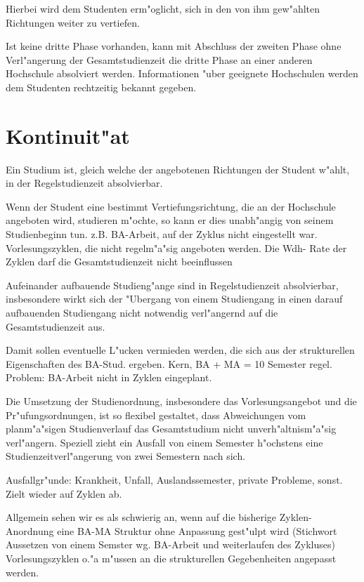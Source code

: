 Hierbei wird dem Studenten erm"oglicht, sich in den von ihm gew"ahlten Richtungen
weiter zu vertiefen.

Ist keine dritte Phase vorhanden, kann mit Abschluss der zweiten Phase ohne Verl"angerung der Gesamtstudienzeit die dritte Phase an einer anderen Hochschule absolviert werden. Informationen "uber geeignete Hochschulen werden dem Studenten rechtzeitig bekannt gegeben.


\section{Kontinuit"at}

Ein Studium ist, gleich welche der angebotenen Richtungen der Student w"ahlt, 
in der Regelstudienzeit absolvierbar.

\begin{kcmt}\begin{komacmt}
Wenn der Student eine bestimmt Vertiefungsrichtung, die an der Hochschule
angeboten wird, studieren m"ochte, so kann er dies unabh"angig von seinem Studienbeginn 
tun. z.B. BA-Arbeit, auf der Zyklus nicht eingestellt war. Vorlesungszyklen, die nicht 
regelm"a"sig angeboten werden. Die Wdh- Rate der Zyklen darf die Gesamtstudienzeit nicht beeinflussen
\end{komacmt}\end{kcmt}

Aufeinander aufbauende Studieng"ange sind in Regelstudienzeit absolvierbar,
insbesondere wirkt sich der "Ubergang von einem Studiengang in einen darauf aufbauenden Studiengang nicht notwendig verl"angernd 
auf die Gesamtstudienzeit aus.

\begin{kcmt}\begin{komacmt}
Damit sollen eventuelle L"ucken vermieden werden, die sich aus der strukturellen 
Eigenschaften des BA-Stud. ergeben. Kern, BA + MA = 10 Semester regel. Problem: 
BA-Arbeit nicht in Zyklen eingeplant.
\end{komacmt}\end{kcmt}

Die Umsetzung der Studienordnung, insbesondere das Vorlesungsangebot und die 
Pr"ufungsordnungen, ist so flexibel gestaltet, dass Abweichungen vom planm"a"sigen 
Studienverlauf das Gesamtstudium nicht unverh"altnism"a"sig verl"angern. 
Speziell zieht ein Ausfall von einem Semester h"ochstens eine Studienzeitverl"angerung 
von zwei Semestern nach sich.

\begin{kcmt}\begin{komacmt}
Ausfallgr"unde: Krankheit, Unfall, Auslandssemester, private Probleme, sonst. Zielt wieder auf Zyklen ab.


Allgemein sehen wir es als schwierig an, wenn auf die bisherige Zyklen-Anordnung eine 
BA-MA Struktur ohne Anpassung gest"ulpt wird (Stichwort Aussetzen von einem Semster 
wg. BA-Arbeit und weiterlaufen des Zykluses) Vorlesungszyklen o."a m"ussen an die 
strukturellen Gegebenheiten angepasst werden. 
\end{komacmt}\end{kcmt}

